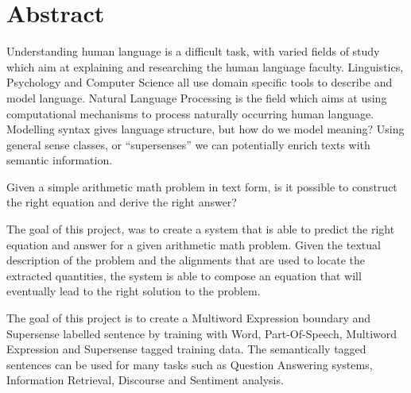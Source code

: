 \chapter*{\Large \center Abstract}\label{abstract}

Understanding human language is a difficult task, with varied fields of study which aim at explaining and researching the human language faculty. Linguistics, Psychology and Computer Science all use domain specific tools to describe and model language. Natural Language Processing is the field which aims at using computational mechanisms to process naturally occurring human language. Modelling syntax gives language structure, but how do we model meaning? Using general sense classes, or ``supersenses'' we can potentially enrich texts with semantic information.

Given a simple arithmetic math problem in text form, is it possible to construct the right equation and derive the right answer?  


The goal of this project, was to create a system that is able to predict the right equation and answer for a given arithmetic math problem. Given the textual description of the problem and the alignments that are used to locate the extracted quantities, the system is able to compose an equation that will eventually lead to the right solution to the problem.  


The goal of this project is to create a Multiword Expression boundary and Supersense labelled sentence by training with Word, Part-Of-Speech, Multiword Expression and Supersense tagged training data. The semantically tagged sentences can be used for many tasks such as Question Answering systems, Information Retrieval, Discourse and Sentiment analysis.

